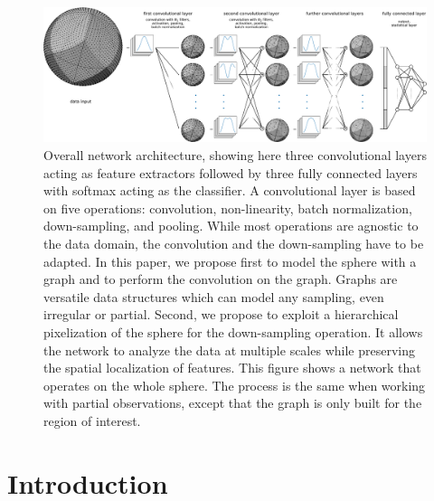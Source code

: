 \documentclass[final,twocolumn,3p,times,sort&compress]{elsarticle}
\newcommand{\1}{\b{1}}              %
\newcommand{\0}{\b{0}}              %
\begin{document}
\begin{figure}
	\centering
	\includegraphics[width=\linewidth]{figure_architecture_v3}
	\caption{Overall network architecture, showing here three convolutional layers acting as feature extractors followed by three fully connected layers with softmax acting as the classifier.
    A convolutional layer is based on five operations: convolution, non-linearity, batch normalization, down-sampling, and pooling.
	While most operations are agnostic to the data domain, the convolution and the down-sampling have to be adapted.
	In this paper, we propose first to model the sphere with a graph and to perform the convolution on the graph.
	Graphs are versatile data structures which can model any sampling, even irregular or partial.
	Second, we propose to exploit a hierarchical pixelization of the sphere for the down-sampling operation.
	It allows the network to analyze the data at multiple scales while preserving the spatial localization of features.
	This figure shows a network that operates on the whole sphere.
	The process is the same when working with partial observations, except that the graph is only built for the region of interest.}
	\label{fig:architecture}
\end{figure}

\section{Introduction}
\label{sec:intro}
\end{document}
